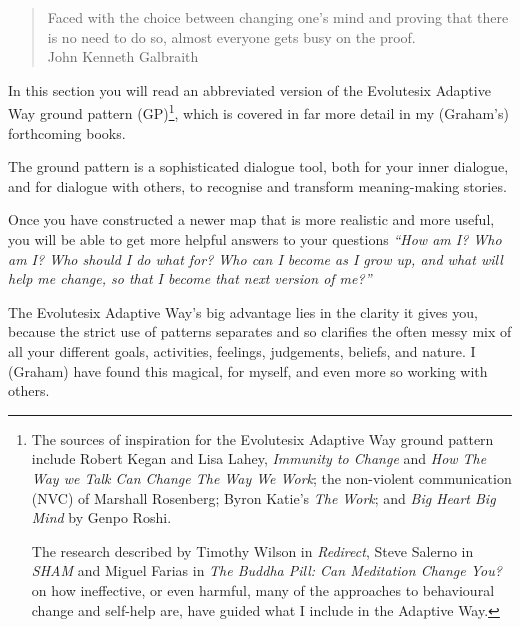 \begin{quotation}
Faced with the choice between changing one's mind and proving that there is no need to do so, almost everyone gets busy on the proof. \\
\raggedleft\textemdash John Kenneth Galbraith\cite{galbraith-mind}
\end{quotation}


In this section you will read an abbreviated version of the Evolutesix Adaptive Way ground pattern (GP)\footnote{
The sources of inspiration for the Evolutesix Adaptive Way ground pattern include Robert Kegan and Lisa Lahey, \emph{Immunity to Change}\cite{kegan-immunity} and \emph{How The Way we Talk Can Change The Way We Work}\cite{kegan-talk};  the non-violent communication (NVC) of Marshall Rosenberg\cite{rosenberg-nvc}; Byron Katie's \emph{The Work}\cite{katie-work}; and \emph{Big Heart Big Mind} by Genpo Roshi\cite{roshi-big}. 


The research described by Timothy Wilson in \emph{Redirect}\cite{wilson-redirect}, Steve Salerno in \emph{SHAM}\cite{salerno-sham} and Miguel Farias in \emph{The Buddha Pill: Can Meditation Change You?}\cite{farias-buddha} on how ineffective, or even harmful, many of the approaches to behavioural change and self-help are, have guided what I include in the Adaptive Way.
}, which is covered in far more detail in my (Graham’s) forthcoming books\cite{boyd-regenerate}. 


The ground pattern is a sophisticated dialogue tool, both for your inner dialogue, and for dialogue with others, to recognise and transform meaning-making stories. 


Once you have constructed a newer map that is more realistic and more useful, you will be able to get more helpful answers to your questions \emph{“How am I? Who am I? Who should I do what for? Who can I become as I grow up, and what will help me change, so that I become that next version of me?”} 


The Evolutesix Adaptive Way’s big advantage lies in the clarity it gives you, because the strict use of patterns separates and so clarifies the often messy mix of all your different goals, activities, feelings, judgements, beliefs, and nature. I (Graham) have found this magical, for myself, and even more so working with others. 


